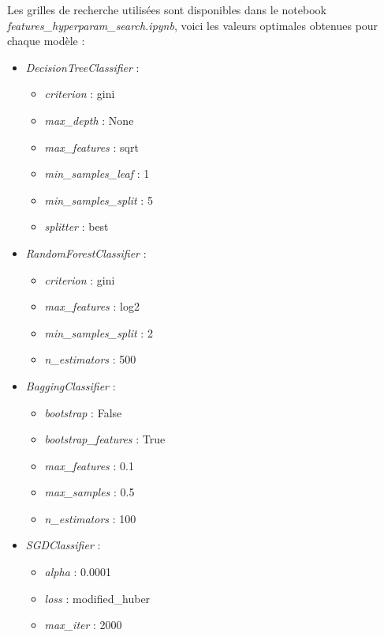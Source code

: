 \documentclass{article}
\begin{document}
Les grilles de recherche utilisées sont disponibles dans le notebook \\
\textit{features\_hyperparam\_search.ipynb}, voici les valeurs optimales obtenues pour
chaque modèle :

\begin{footnotesize}
\begin{multicols}{2}
\begin{itemize}
    \item \textit{DecisionTreeClassifier} :
    \begin{itemize}
        \item \textit{criterion} : gini
        \item \textit{max\_depth} : None
        \item \textit{max\_features} : sqrt
        \item \textit{min\_samples\_leaf} : 1
        \item \textit{min\_samples\_split} : 5
        \item \textit{splitter} : best
    \end{itemize}
    \item \textit{RandomForestClassifier} :
    \begin{itemize}
        \item \textit{criterion} : gini
        \item \textit{max\_features} : log2
        \item \textit{min\_samples\_split} : 2
        \item \textit{n\_estimators} : 500
    \end{itemize}
    \item \textit{BaggingClassifier} :
    \begin{itemize}
        \item \textit{bootstrap} : False
        \item \textit{bootstrap\_features} : True
        \item \textit{max\_features} : 0.1
        \item \textit{max\_samples} : 0.5
        \item \textit{n\_estimators} : 100
    \end{itemize}
    \item \textit{SGDClassifier} :
    \begin{itemize}
        \item \textit{alpha} : 0.0001
        \item \textit{loss} : modified\_huber
        \item \textit{max\_iter} : 2000

\end{itemize}
\end{itemize}
\end{multicols}
\end{footnotesize}
\end{document}
